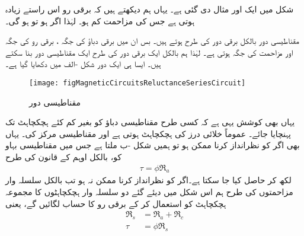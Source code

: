 شکل   میں ایک اور مثال دی گئی ہے۔ یہاں ہم دیکھتے ہیں کہ برقی رو اس راستے زیادہ ہوتی ہے جس کی مزاحمت کم ہو۔ لہٰذا اگر ہو تو  ہو گی۔

مقناطیسی دور بالکل برقی دور کی طرح ہوتے ہیں۔ بس ان میں برقی دباؤ  کی جگہ   ، برقی رو   کی جگہ    اور مزاحمت  کی جگہ     ہوتی ہے۔ لہٰذا ہم بالکل ایک برقی دور کی طرح ایک مقناطیسی دور بنا سکتے ہیں۔ ایسا ہی ایک دور شکل -الف میں دکھایا گیا ہے۔
\begin{figure}
\centering
\texttt{[image: figMagneticCircuitsReluctanceSeriesCircuit]}
\caption{مقناطیسی دور}
\label{شکل_مقناطیسی__مقناطیسی_سلسلہ_وار_دور}
\end{figure}
%
یہاں بھی کوشش یہی ہے کہ کسی طرح مقناطیسی دباؤ  کو بغیر کم کئے ہچکچاہٹ  تک پہنچایا جائے۔ عموماً  خلائی درز کی ہچکچاہٹ ہوتی ہے اور  مقناطیسی مرکز کی۔ یہاں بھی اگر  کو نظرانداز کرنا ممکن ہو تو ہمیں شکل -ب ملتا ہے جس میں مقناطیسی بہاو  کو، بالکل اوہم کے قانون کی طرح
\begin{align}
\tau=\phi \Re_a
\end{align}
لکھ کر حاصل کیا جا سکتا ہے۔اگر  کو نظرانداز کرنا ممکن نہ ہو تب بالکل سلسلہ وار مزاحمتوں کی طرح ہم اس شکل میں دیئے گئے دو سلسلہ وار ہچکچاہٹوں کا مجموعہ ہچکچاہٹ   کو استعمال کر کے برقی رو کا حساب لگائیں گے، یعنی
\begin{align}
\Re_s&=\Re_a+\Re_c\\
\tau&=\phi \Re_s \label{مساوات_مقناطیسی_دور_مقناطیسی_اوہم_قانون}
\end{align}
